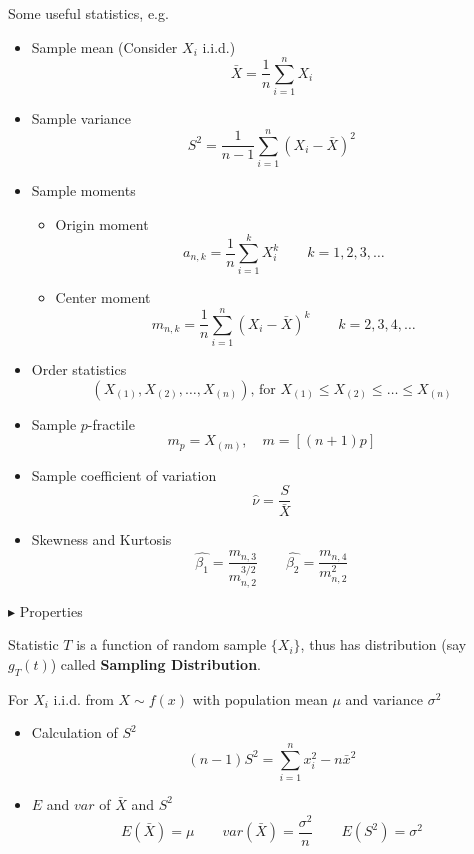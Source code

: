 \documentclass[11pt,a4paper]{ctexart}
\numberwithin{equation}{section}%
\newenvironment{point}{\raggedright$\blacktriangleright$}{}%
\begin{document}
    Some useful statistics, e.g.
    \begin{itemize}
        \item Sample mean (Consider $X_i$ i.i.d.)
        \[
            \bar{X}=\frac{1}{n}\sum_{i=1}^n X_i
        \]
        \item Sample variance
        \[
            S^2=\frac{1}{n-1}\sum_{i=1}^n(X_i-\bar{X})^2  
        \]
        \item Sample moments
        \begin{itemize}
            \item Origin moment
            \[
                a_{n,k}=\frac{1}{n}\sum_{i=1}^k X_i^k\qquad k=1,2,3,\ldots    
            \]
            \item Center moment
            \[
                m_{n,k}=\frac{1}{n}\sum_{i=1}^n (X_i-\bar{X})^k\qquad k=2,3,4,\ldots    
            \]
        \end{itemize}
        \item Order statistics
        \[
            (X_{(1)},X_{(2)},\ldots,X_{(n)}),\,\text{for }X_{(1)}\leq X_{(2)} \leq \ldots\leq X_{(n)}    
        \]
        \item Sample $p$-fractile
        \[
            m_p=X_{(m)},\quad m=[(n+1)p]   
        \]
        \item Sample coefficient of variation
        \[
            \hat{\nu}=\frac{S}{\bar{X}}    
        \]
        \item Skewness and Kurtosis
        \[
            \hat{\beta_1}=\frac{m_{n,3}}{m_{n,2}^{3/2}}\qquad \hat{\beta_2}=\frac{m_{n,4}}{m_{n,2}^2}    
        \]
    \end{itemize}

    \begin{point}
        Properties
    \end{point}
    
        

    Statistic $T$ is a function of random sample $\{X_i\}$, thus has distribution (say $g_T(t)$) called \textbf{Sampling Distribution}.

        For $X_i$ i.i.d. from $X\sim f(x)$ with population mean $\mu$ and variance $\sigma^2$
    \begin{itemize}
        \item Calculation of $S^2$
        \[(n-1)S^2=\sum_{i=1}^n x_i^2-n\bar{x}^2\]
        \item $E$ and $var$ of $\bar{X}$ and $S^2$
        \[E(\bar{X})=\mu\qquad var(\bar{X})=\frac{\sigma^2}{n}\qquad E(S^2)=\sigma^2\]
    \end{itemize}
\end{document}
